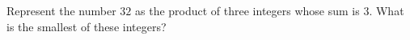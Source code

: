 Represent the number $32$ as the product of three integers whose sum is $3$. What is the smallest of these integers?
